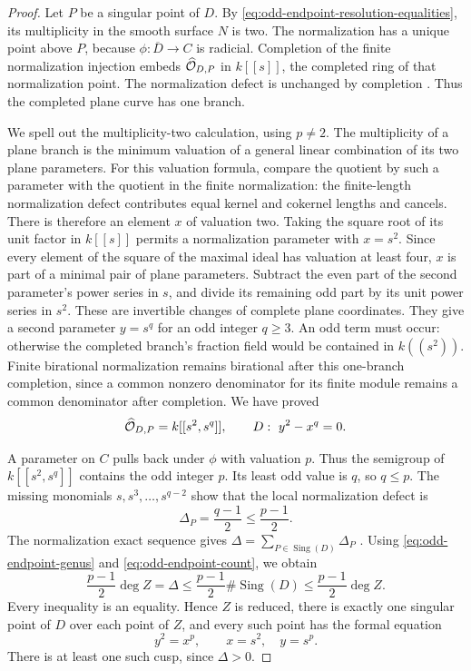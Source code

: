 \begin{proof}
Let $P$ be a singular point of $D$.
By \eqref{eq:odd-endpoint-resolution-equalities}, its multiplicity
in the smooth surface $N$ is two.
The normalization has a unique point above $P$, because
$\phi:\overline D\to C$ is radicial.
Completion of the finite normalization injection embeds
$\widehat{\mathcal O}_{D,P}$ in $k[[s]]$, the completed ring of that
normalization point.
The normalization defect is unchanged by completion
\cite[Tags~0C1R and~0C3V]{Stacks}.
Thus the completed plane curve has one branch.

We spell out the multiplicity-two calculation, using $p\ne2$.
The multiplicity of a plane branch is the minimum valuation of
a general linear combination of its two plane parameters.
For this valuation formula, compare the quotient by such a
parameter with the quotient in the finite normalization:
the finite-length normalization defect contributes equal
kernel and cokernel lengths and cancels.
There is therefore an element $x$ of valuation two.
Taking the square root of its unit factor in $k[[s]]$ permits a
normalization parameter with $x=s^2$.
Since every element of the square of the maximal ideal has
valuation at least four, $x$ is part of a minimal pair of
plane parameters.
Subtract the even part of the second parameter's power series
in $s$, and divide its remaining odd part by its unit power
series in $s^2$.
These are invertible changes of complete plane coordinates.
They give a second parameter $y=s^q$ for an odd integer $q\geq3$.
An odd term must occur: otherwise the completed branch's
fraction field would be contained in $k((s^2))$.
Finite birational normalization remains birational after this
one-branch completion, since a common nonzero denominator
for its finite module remains a common denominator after
completion.
We have proved
\[
 \widehat{\mathcal O}_{D,P}=k[[s^2,s^q]],\qquad
 D:\ y^2-x^q=0.
\]

A parameter on $C$ pulls back under $\phi$ with valuation $p$.
Thus the semigroup of $k[[s^2,s^q]]$ contains the odd integer $p$.
Its least odd value is $q$, so $q\leq p$.
The missing monomials $s,s^3,\ldots,s^{q-2}$ show that the
local normalization defect is
\[
 \Delta_P=\frac{q-1}{2}\leq\frac{p-1}{2}.
\]
The normalization exact sequence gives
$\Delta=\sum_{P\in\operatorname{Sing}(D)}\Delta_P$
\cite[Tag~0C1R]{Stacks}.
Using \eqref{eq:odd-endpoint-genus} and
\eqref{eq:odd-endpoint-count}, we obtain
\[
 \frac{p-1}{2}\deg Z
 =\Delta
 \leq\frac{p-1}{2}\#\operatorname{Sing}(D)
 \leq\frac{p-1}{2}\deg Z.
\]
Every inequality is an equality.
Hence $Z$ is reduced, there is exactly one singular point of
$D$ over each point of $Z$, and every such point has the formal
equation
\begin{equation}\label{eq:odd-endpoint-cusp}
 y^2=x^p,\qquad x=s^2,\quad y=s^p.
\end{equation}
There is at least one such cusp, since $\Delta>0$.


\end{proof}

